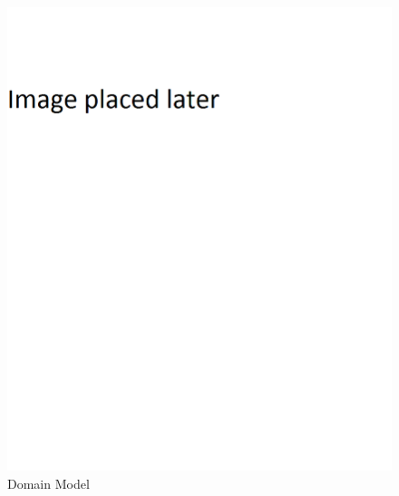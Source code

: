 	\begin{figure}[!ht]
		\centering
		\includegraphics[scale=0.5, width=15cm, keepaspectratio]{./Images/default.png}
		\caption{Domain Model}
		\label{Connection to the computer}
	\end{figure}

